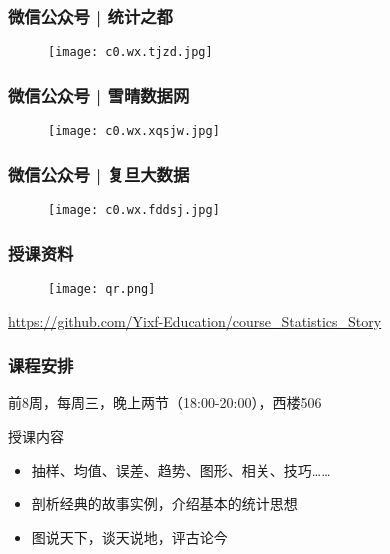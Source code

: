 \begin{frame}
  \frametitle{微信公众号 | 统计之都}
  \begin{figure}
    \centering
    \texttt{[image: c0.wx.tjzd.jpg]}
  \end{figure}
\end{frame}

\begin{frame}
  \frametitle{微信公众号 | 雪晴数据网}
  \begin{figure}
    \centering
    \texttt{[image: c0.wx.xqsjw.jpg]}
  \end{figure}
\end{frame}
\begin{frame}
  \frametitle{微信公众号 | 复旦大数据}
  \begin{figure}
    \centering
    \texttt{[image: c0.wx.fddsj.jpg]}
  \end{figure}
\end{frame}

\begin{frame}
  \frametitle{授课资料}
  \begin{figure}
    \centering
    \texttt{[image: qr.png]}
  \end{figure}
  \begin{center}
    \href{https://github.com/Yixf-Education/course_Statistics_Story}{https://github.com/Yixf-Education/course\_Statistics\_Story}
  \end{center}
\end{frame}


\begin{frame}
  \frametitle{课程安排}
  \begin{center}
  \alert{前8周，每周三，晚上两节（18:00-20:00），西楼506}\\
  \vspace{0.2cm}
  \end{center}
  \begin{block}{授课内容}
    \begin{itemize}
      \item 抽样、均值、误差、趋势、图形、相关、技巧……
      \item 剖析经典的故事实例，介绍基本的统计思想
      \item 图说天下，谈天说地，评古论今
    \end{itemize}
  \end{block}
\end{frame}

